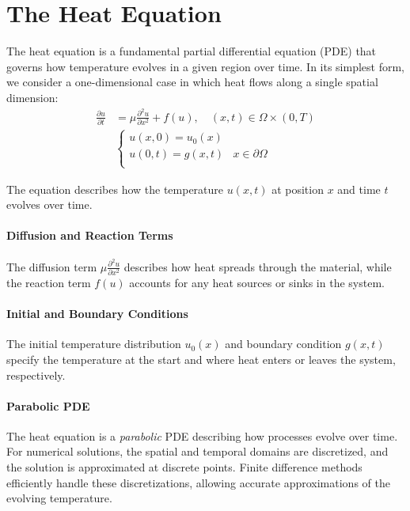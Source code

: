 \section{The Heat Equation}

The heat equation is a fundamental partial differential equation (PDE) that governs how temperature evolves in a given region over time. In its simplest form, we consider a one-dimensional case in which heat flows along a single spatial dimension:
\begin{align*}
  \frac{\partial u}{\partial t} & = \mu \frac{\partial^2 u}{\partial x^2} + f(u), \quad \left( x, t \right) \in \Omega \times \left(0, T\right) \tag{PDE} \\
                                &
  \begin{cases}
    u(x, 0) = u_0(x)  &                       \\
    u(0, t) = g(x, t) & x \in \partial \Omega \\
  \end{cases} \tag{BC}
\end{align*}\label{eq:heat_eq}

The equation describes how the temperature \(u(x, t)\) at position \(x\) and time \(t\) evolves over time.

\paragraph{Diffusion and Reaction Terms}
The diffusion term \(\mu \frac{\partial^2 u}{\partial x^2}\) describes how heat spreads through the material, while the reaction term \(f(u)\) accounts for any heat sources or sinks in the system.

\paragraph{Initial and Boundary Conditions}
The initial temperature distribution \(u_0(x)\) and boundary condition \(g(x, t)\) specify the temperature at the start and where heat enters or leaves the system, respectively.

\paragraph{Parabolic PDE}
The heat equation is a \emph{parabolic} PDE describing how processes evolve over time. For numerical solutions, the spatial and temporal domains are discretized, and the solution is approximated at discrete points. Finite difference methods efficiently handle these discretizations, allowing accurate approximations of the evolving temperature.

